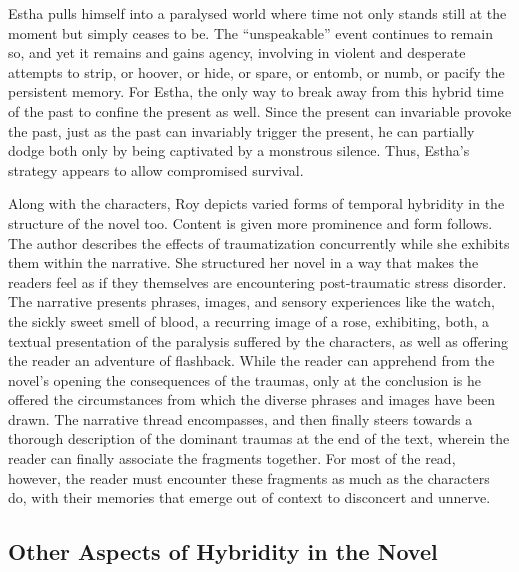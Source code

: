 Estha pulls himself into a paralysed world where time not only stands still at the moment but simply ceases to be. The ``unspeakable'' event continues to remain so, and yet it remains and gains agency, involving in violent and desperate attempts to strip, or hoover, or hide, or spare, or entomb, or numb, or pacify the persistent memory. For Estha, the only way to break away from this hybrid time of the past to confine the present as well. Since the present can invariable provoke the past, just as the past can invariably trigger the present, he can partially dodge both only by being captivated by a monstrous silence. Thus, Estha's strategy appears to allow compromised survival.

Along with the characters, Roy depicts varied forms of temporal hybridity in the structure of the novel too. Content is given more prominence and form follows. The author describes the effects of traumatization concurrently while she exhibits them within the narrative. She structured her novel in a way that makes the readers feel as if they themselves are encountering post-traumatic stress disorder. The narrative presents phrases, images, and sensory experiences like the watch, the sickly sweet smell of blood, a recurring image of a rose, exhibiting, both, a textual presentation of the paralysis suffered by the characters, as well as offering the reader an adventure of flashback. While the reader can apprehend from the novel's opening the consequences of the traumas, only at the conclusion is he offered the circumstances from which the diverse phrases and images have been drawn. The narrative thread encompasses, and then finally steers towards a thorough description of the dominant traumas at the end of the text, wherein the reader can finally associate the fragments together. For most of the read, however, the reader must encounter these fragments as much as the characters do, with their memories that emerge out of context to disconcert and unnerve. 

\subsection{Other Aspects of Hybridity in the Novel}

